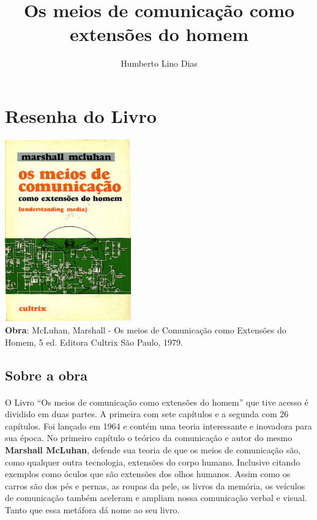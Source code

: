 \documentclass[12pt,a4paper]{article}
\title{Os meios de comunicação como extensões do homem}
\author{Humberto Lino Dias}
\begin{document}
\maketitle
{}
\singlespacing
 
 
\section{Resenha do Livro}

\begin{center}

\includegraphics[height=3.1in]{book_cover.eps} \\ [1em]
\textbf{Obra}: McLuhan, Marshall - Os meios de Comunicação como Extensões do Homem, 5 ed. Editora Cultrix São Paulo, 1979. \cite{understanding_media}

\end{center}

 
\subsection{Sobre a obra}
 
\paragraph{}
O Livro ``Os meios de comunicação como extensões do homem''\cite{understanding_media} que tive acesso é dividido em duas partes. A primeira com sete capítulos e a segunda com 26 capítulos. Foi lançado em 1964 e contém uma teoria interessante e inovadora para sua época. No primeiro capítulo o teórico da comunicação e autor do mesmo \textbf{Marshall McLuhan}\cite{wiki:marshall_mcluhan}, defende sua teoria de que os meios de comunicação são, como qualquer outra tecnologia, extensões do corpo humano.
Inclusive citando exemplos como óculos que são extensões dos olhos humanos. Assim como os carros são dos pés e pernas, as roupas da pele, os livros da memória, os veículos de comunicação também aceleram e ampliam nossa comunicação verbal e visual. Tanto que essa metáfora dá nome ao seu livro.
\end{document}
